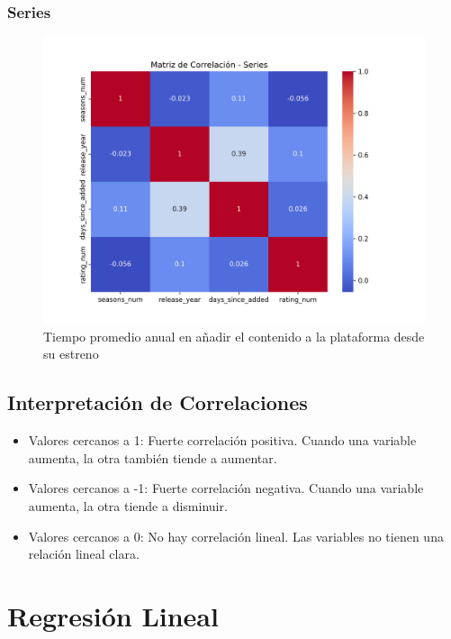 \documentclass{article}
\begin{document}
\subsubsection{Series}
\begin{figure}[H]
	\centering
	\includegraphics[width=\textwidth]{Graphs/matriz_correlacion_series.png}
	\caption{Tiempo promedio anual en añadir el contenido a la plataforma desde su estreno }
	\label{fig:matriz_correlacion_series}
\end{figure}



\subsection{Interpretación de Correlaciones}
\begin{itemize}
    \item Valores cercanos a 1: Fuerte correlación positiva. Cuando una variable aumenta, la otra también tiende a aumentar.
    \item Valores cercanos a -1: Fuerte correlación negativa. Cuando una variable aumenta, la otra tiende a disminuir.
    \item Valores cercanos a 0: No hay correlación lineal. Las variables no tienen una relación lineal clara.
\end{itemize}

\section{Regresión Lineal}
\end{document}
